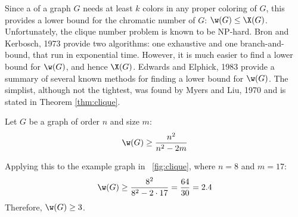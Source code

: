 Since a  of a graph \(G\) needs at least \(k\) colors in any proper coloring of \(G\), this provides a
lower bound for the chromatic number of \(G\): \(\w(G)\le\X(G)\).  Unfortunately, the clique number problem is
known to be NP-hard.  Bron and Kerbosch, 1973 \cite{bron} provide two algorithms: one exhaustive and one
branch-and-bound, that run in exponential time.  However, it is much easier to find a lower bound for \(\w(G)\),
and hence \(\X(G)\).  Edwards and Elphick, 1983 \cite{edwards} provide a summary of several known methods for
finding a lower bound for \(\w(G)\).  The simplist, although not the tightest, was found by Myers and Liu, 1970
\cite{myers} and is stated in Theorem \ref{thm:clique}.

\begin{theorem}
  \label{thm:clique}
  Let \(G\) be a graph of order \(n\) and size \(m\):
  \[\w(G)\ge\frac{n^2}{n^2-2m}\]
\end{theorem}

Applying this to the example graph in \figurename~\ref{fig:clique}, where \(n=8\) and \(m=17\):
\[\w(G)\ge\frac{8^2}{8^2-2\cdot17}=\frac{64}{30}=2.4\]
Therefore, \(\w(G)\ge3\).
